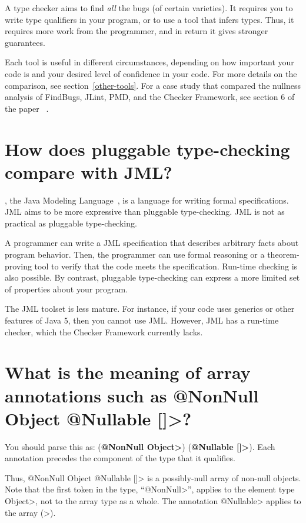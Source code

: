 A type checker aims to find \emph{all} the bugs (of certain varieties).
It requires you to write type qualifiers in your program, or to use a tool
that infers types.  Thus, it requires more work from the programmer, and in
return it gives stronger guarantees.

Each tool is useful in different circumstances, depending on how important
your code is and your desired level of confidence in your code.  For more
details on the comparison, see section~\ref{other-tools}.  For a case study
that compared the nullness analysis of FindBugs, JLint, PMD, and the
Checker Framework, see section 6 of the paper
~\cite{PapiACPE2008}.


\section{How does pluggable type-checking compare with JML?\label{faq-jml}}

, the Java Modeling
Language~\cite{LeavensBR2006:JML}, is a language for writing formal
specifications.  JML aims to be more expressive than pluggable
type-checking.  JML is not as practical as pluggable type-checking.

A programmer can write a JML specification that
describes arbitrary facts about program behavior.  Then, the programmer can
use formal reasoning or a theorem-proving tool to verify that the code
meets the specification.  Run-time checking is also possible.
By contrast, pluggable type-checking can express a more limited set of
properties about your program.

The JML toolset is less mature.  For instance, if your code uses
generics or other features of Java 5, then you cannot use JML.  
However, JML has a run-time checker, which the Checker Framework currently
lacks.


\section{What is the meaning of array annotations such as \<@NonNull Object @Nullable []>?\label{faq-array-syntax-meaning}}

You should parse this as:
(\textbf{\<@NonNull Object>}) (\textbf{\<@Nullable []>}).
Each annotation precedes the component of the type that it qualifies.

Thus,
\<@NonNull Object @Nullable []> is a possibly-null array of non-null
objects.  Note that the first token in the type,
``\<@NonNull>'', applies to the element
type \<Object>, not to the array type as a whole.  The annotation \<@Nullable> applies to the
array (\<[]>).

